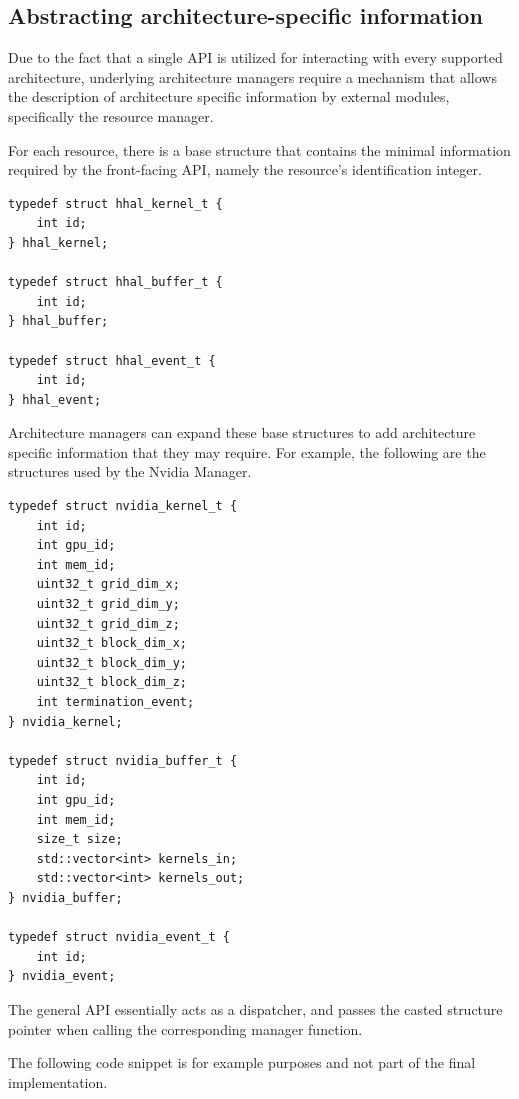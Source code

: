 \subsection{Abstracting architecture-specific information}

Due to the fact that a single API is utilized for interacting with every supported architecture, underlying architecture managers require a mechanism that allows the description of architecture specific information by external modules, specifically the resource manager.

For each resource, there is a base structure that contains the minimal information required by the front-facing API, namely the resource's identification integer. 

\begin{lstlisting}[style=CStyle, caption=HHAL API - Base structures]
typedef struct hhal_kernel_t {
    int id;
} hhal_kernel;

typedef struct hhal_buffer_t {
    int id;
} hhal_buffer;

typedef struct hhal_event_t {
    int id;
} hhal_event;
\end{lstlisting}

Architecture managers can expand these base structures to add architecture specific information that they may require. For example, the following are the structures used by the Nvidia Manager.

\begin{lstlisting}[style=CStyle, caption=HHAL Nvidia Manager - Extended structures]
typedef struct nvidia_kernel_t {
    int id;
    int gpu_id;
    int mem_id;
    uint32_t grid_dim_x;
    uint32_t grid_dim_y;
    uint32_t grid_dim_z;
    uint32_t block_dim_x;
    uint32_t block_dim_y;
    uint32_t block_dim_z;
    int termination_event;
} nvidia_kernel;

typedef struct nvidia_buffer_t {
    int id;
    int gpu_id;
    int mem_id;
    size_t size;
    std::vector<int> kernels_in;
    std::vector<int> kernels_out;
} nvidia_buffer;

typedef struct nvidia_event_t {
    int id;
} nvidia_event;
\end{lstlisting}

The general API essentially acts as a dispatcher, and passes the casted structure pointer when calling the corresponding manager function. 

The following code snippet is for example purposes and not part of the final implementation.

